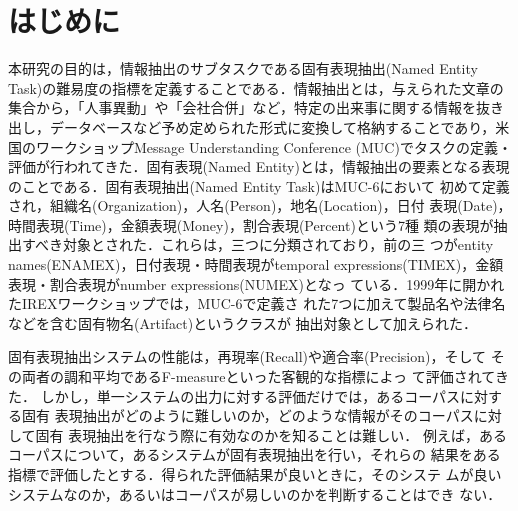 

\maketitle
\thispagestyle{empty}

\section{はじめに}

本研究の目的は，情報抽出のサブタスクである固有表現抽出(Named Entity
Task)の難易度の指標を定義することである．情報抽出とは，与えられた文章の
集合から，「人事異動」や「会社合併」など，特定の出来事に関する情報を抜き
出し，データベースなど予め定められた形式に変換して格納することであり，米
国のワークショップMessage Understanding Conference (MUC)でタスクの定義・
評価が行われてきた．固有表現(Named Entity)とは，情報抽出の要素となる表現
のことである．固有表現抽出(Named Entity Task)はMUC-6\cite{MUC6}において
初めて定義され，組織名(Organization)，人名(Person)，地名(Location)，日付
表現(Date)，時間表現(Time)，金額表現(Money)，割合表現(Percent)という7種
類の表現が抽出すべき対象とされた．これらは，三つに分類されており，前の三
つがentity names(ENAMEX)，日付表現・時間表現がtemporal
expressions(TIMEX)，金額表現・割合表現がnumber expressions(NUMEX)となっ
ている．1999年に開かれたIREXワークショップ\cite{IREXproc}では，MUC-6で定義さ
れた7つに加えて製品名や法律名などを含む固有物名(Artifact)というクラスが
抽出対象として加えられた．

固有表現抽出システムの性能は，再現率(Recall)や適合率(Precision)，そして
その両者の調和平均であるF-measureといった客観的な指標\footnotemark{}によっ
て評価されてきた．
しかし，単一システムの出力に対する評価だけでは，あるコーパスに対する固有
表現抽出がどのように難しいのか，どのような情報がそのコーパスに対して固有
表現抽出を行なう際に有効なのかを知ることは難しい．
例えば，あるコーパスについて，あるシステムが固有表現抽出を行い，それらの
結果をある指標で評価したとする．得られた評価結果が良いときに，そのシステ
ムが良いシステムなのか，あるいはコーパスが易しいのかを判断することはでき
ない．

